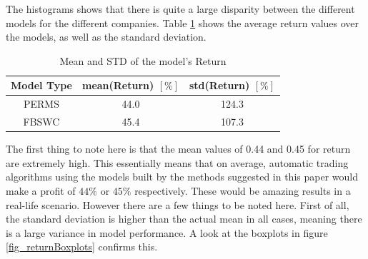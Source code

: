 The histograms shows that there is quite a large disparity between the different models for the different companies. Table \ref{table_firstRunReturn} shows the average return values over the models, as well as the standard deviation.

\begin{table}
\label{table_firstRunReturn}	
\caption{Mean and STD of the model's Return}
\begin{tabular}{ c | c | c }		
  Model Type & mean(Return)  $[\%]$ & std(Return) $[\%]$ \\
  \hline
  PERMS & 44.0 & 124.3 \\
  FBSWC & 45.4 & 107.3 \\
\end{tabular}
\end{table}

 The first thing to note here is that the mean values of 0.44 and 0.45 for return are extremely high. This essentially means that on average, automatic trading algorithms using the models built by the methods suggested in this paper would make a profit of $44\%$ or $45\%$ respectively. These would be amazing results in a real-life scenario. However there are a few things to be noted here. First of all, the standard deviation is higher than the actual mean in all cases, meaning there is a large variance in model performance. A look at the boxplots in figure \ref{fig_returnBoxplots} confirms this.
 
